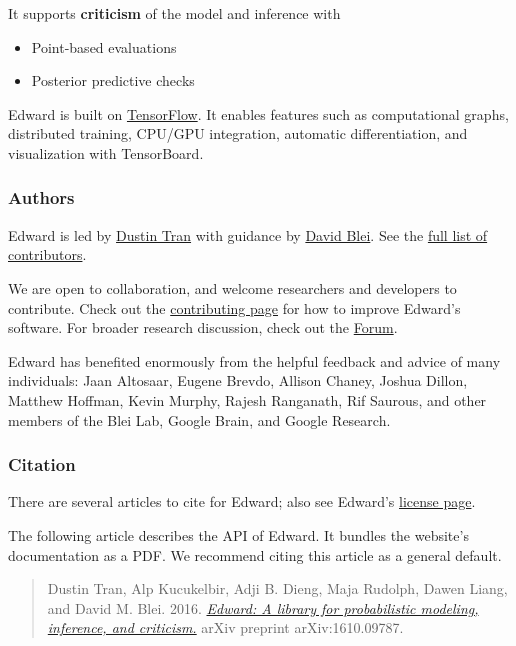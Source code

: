 It supports \textbf{criticism} of the model and inference with

\begin{itemize}
\item Point-based evaluations
\item Posterior predictive checks
\end{itemize}

Edward is built on
\href{https://www.tensorflow.org}{TensorFlow}. It enables features such
as computational graphs, distributed training, CPU/GPU integration,
automatic differentiation, and visualization with TensorBoard.

\subsubsection{Authors}

Edward is led by \href{http://dustintran.com}{Dustin Tran} with
guidance by \href{http://www.cs.columbia.edu/~blei/}{David Blei}.
See the \href{https://github.com/blei-lab/edward/graphs/contributors}
{full list of contributors}.

We are open to collaboration, and welcome
researchers and developers to contribute. Check out the
\href{/contributing}{contributing page} for how to improve Edward's software.
For broader research discussion, check out the
\href{https://discourse.edwardlib.org}{Forum}.

Edward has benefited enormously from the helpful feedback and advice
of many individuals: Jaan Altosaar, Eugene Brevdo, Allison Chaney,
Joshua Dillon, Matthew Hoffman, Kevin Murphy, Rajesh Ranganath, Rif
Saurous, and other members of the Blei Lab, Google Brain, and Google
Research.

\subsubsection{Citation}

There are several articles to cite for Edward;
also see Edward's \href{/license}{license page}.

The following article describes the API of Edward. It bundles the
website's documentation as a PDF.
We recommend citing this article as a general default.

\begin{quote}
Dustin Tran, Alp Kucukelbir, Adji B. Dieng, Maja Rudolph, Dawen Liang,
and David M. Blei.
2016.
\href{https://arxiv.org/abs/1610.09787}
{\emph{Edward: A library for probabilistic modeling, inference, and criticism.}}
arXiv preprint arXiv:1610.09787.
\end{quote}

